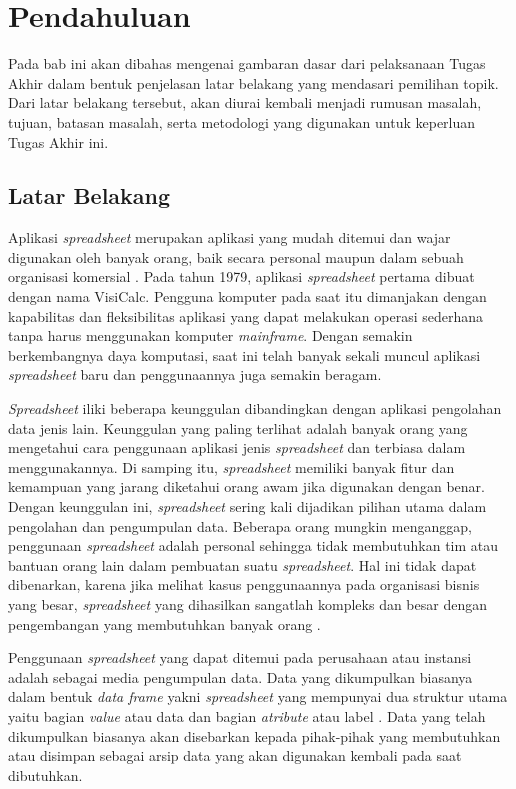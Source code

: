 \chapter{Pendahuluan}

Pada bab ini akan dibahas mengenai gambaran dasar dari pelaksanaan Tugas Akhir dalam bentuk penjelasan latar belakang yang mendasari pemilihan topik. Dari latar belakang tersebut, akan diurai kembali menjadi rumusan masalah, tujuan, batasan masalah, serta metodologi yang digunakan untuk keperluan Tugas Akhir ini.

\section{Latar Belakang}

Aplikasi \textit{spreadsheet} merupakan aplikasi yang mudah ditemui dan wajar digunakan oleh banyak orang, baik secara personal maupun dalam sebuah organisasi komersial \citep{Chan1996}. Pada tahun 1979, aplikasi \textit{spreadsheet} pertama dibuat dengan nama VisiCalc. Pengguna komputer pada saat itu dimanjakan dengan kapabilitas dan fleksibilitas aplikasi yang dapat melakukan operasi sederhana tanpa harus menggunakan komputer \textit{mainframe}. Dengan semakin berkembangnya daya komputasi, saat ini telah banyak sekali muncul aplikasi \textit{spreadsheet} baru dan penggunaannya juga semakin beragam.

\textit{Spreadsheet} iliki beberapa keunggulan dibandingkan dengan aplikasi pengolahan data jenis lain. Keunggulan yang paling terlihat adalah banyak orang yang mengetahui cara penggunaan aplikasi jenis \textit{spreadsheet} dan terbiasa dalam menggunakannya. Di samping itu, \textit{spreadsheet} memiliki banyak fitur dan kemampuan yang jarang diketahui orang awam jika digunakan dengan benar. Dengan keunggulan ini, \textit{spreadsheet} sering kali dijadikan pilihan utama dalam pengolahan dan pengumpulan data. Beberapa orang mungkin menganggap, penggunaan \textit{spreadsheet} adalah personal sehingga tidak membutuhkan tim atau bantuan orang lain dalam pembuatan suatu \textit{spreadsheet}. Hal ini tidak dapat dibenarkan, karena jika melihat kasus penggunaannya pada organisasi bisnis yang besar, \textit{spreadsheet} yang dihasilkan sangatlah kompleks dan besar dengan pengembangan yang membutuhkan banyak orang \citep{Panko1998}.

Penggunaan \textit{spreadsheet} yang dapat ditemui pada perusahaan atau instansi adalah sebagai media pengumpulan data. Data yang dikumpulkan biasanya dalam bentuk \textit{data frame} yakni \textit{spreadsheet} yang mempunyai dua struktur utama yaitu bagian \textit{value} atau data dan bagian \textit{atribute} atau label \citep{Chen2013}. Data yang telah dikumpulkan biasanya akan disebarkan kepada pihak-pihak yang membutuhkan atau disimpan sebagai arsip data yang akan digunakan kembali pada saat dibutuhkan.

